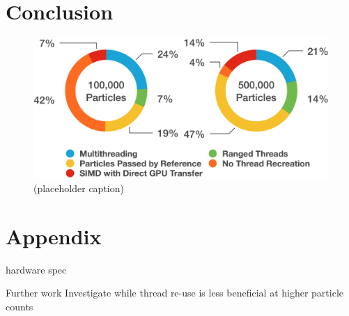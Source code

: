 \documentclass[11pt, a4paper, twocolumn]{article}
\begin{document}
\section{Conclusion}

\lipsum[1-1]

\begin{figure}[h]
\includegraphics[width=\linewidth]{speedup-pies}
\caption{(placeholder caption)}
\label{fig:speedup-pies}
\end{figure}

\lipsum[1-1]







\section{Appendix}

hardware spec

Further work
Investigate while thread re-use is less beneficial at higher particle counts
\end{document}
